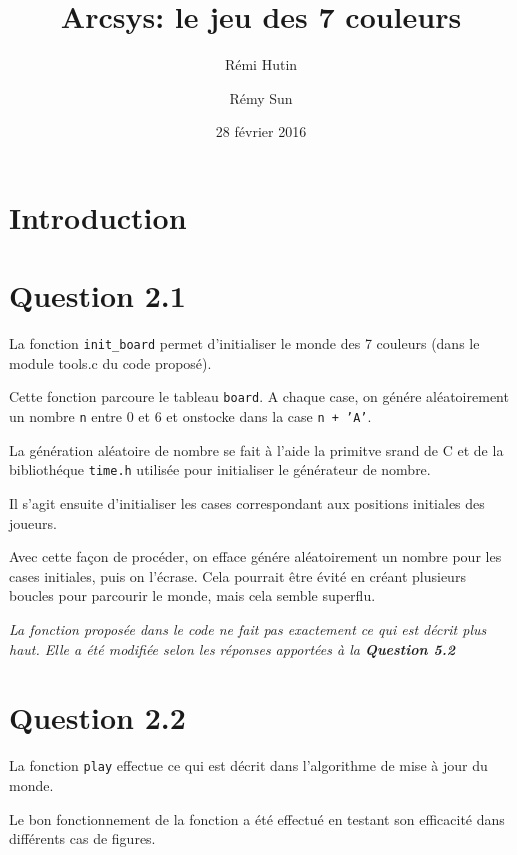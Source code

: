 \documentclass[a4paper,11pt]{article}
\title{Arcsys: le jeu des 7 couleurs}
\author{Rémi Hutin \and Rémy Sun}
\date{28 février 2016}
\newcommand{\dbend}{{\manual\char127}}
\newenvironment{attention}%
{\description\item[\dbend]\sl}%
{\enddescription}
\begin{document}
\maketitle

\begin{abstract}
  
\end{abstract}

\section*{Introduction}

\section*{Question 2.1}

La fonction \texttt{init\_board} permet d'initialiser le monde des 7 couleurs (dans le module tools.c du code proposé).

Cette fonction parcoure le tableau \texttt{board}. A chaque case, on génére aléatoirement un nombre \texttt{n} entre 0 et 6 et onstocke dans la case \texttt{n + 'A'}.

La génération aléatoire de nombre se fait à l'aide la primitve srand de C et de la bibliothéque \texttt{time.h} utilisée pour initialiser le générateur de nombre.

Il s'agit ensuite d'initialiser les cases correspondant aux positions initiales des joueurs.

Avec cette façon de procéder, on efface génére aléatoirement un nombre pour les cases initiales, puis on l'écrase. Cela pourrait être évité en créant plusieurs boucles pour parcourir le monde, mais cela semble superflu.

\begin{attention}
  La fonction proposée dans le code ne fait pas exactement ce qui est décrit plus haut. Elle a été modifiée selon les réponses apportées à la \textbf{Question 5.2}
\end{attention}

\section*{Question 2.2}

La fonction \texttt{play} effectue ce qui est décrit dans l'algorithme de mise à jour du monde.

Le bon fonctionnement de la fonction a été effectué en testant son efficacité dans différents cas de figures.
\end{document}
